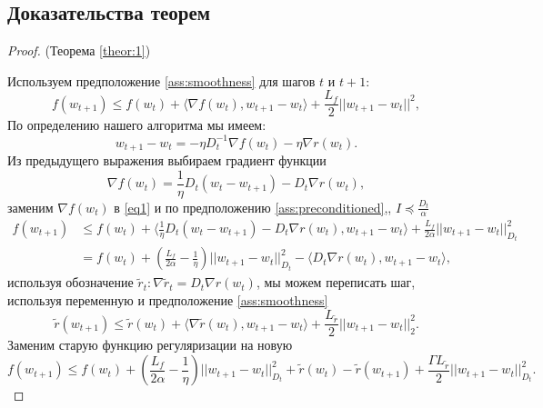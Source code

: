 \subsection{Доказательства теорем}
\label{appendix:theorems}

\begin{proof} (Теорема \ref{theor:1})
\label{proof:theorem1}

Используем предположение \eqref{ass:smoothness} для шагов $t$ и $t+1$:
\begin{equation} \label{eq1}
    f(w_{t+1}) \leq f(w_t) + \langle \nabla f(w_t), w_{t+1} - w_t \rangle + \frac{L_f}{2}||w_{t+1} - w_t ||^2,
\end{equation}
По определению нашего алгоритма мы имеем:
\begin{equation*}
w_{t+1} - w_t = -\eta D_t^{-1} \nabla f(w_t) - \eta \nabla r(w_t).
\end{equation*}
Из предыдущего выражения выбираем градиент функции
\begin{equation*}
\nabla f(w_t) = \frac{1}{\eta} D_t(w_t - w_{t+1}) - D_t \nabla r(w_t),
\end{equation*}
заменим $\nabla f(w_t)$ в \ref{eq1} и по предположению \ref{ass:preconditioned},, $I \preccurlyeq \frac{D_t}{\alpha}$
\begin{equation*}
\begin{split}
    f(w_{t+1}) &\leq f(w_t) + \langle \frac{1}{\eta}D_t(w_t - w_{t+1}) - D_t\nabla r(w_t), w_{t+1} - w_t \rangle + \frac{L_f}{2 \alpha} ||w_{t+1} - w_t||_{D_t}^2 \\
    &= f(w_t) + \left(\frac{L_f}{2 \alpha} - \frac{1}{\eta} \right) ||w_{t+1} - w_t||_{D_t}^2 - \langle D_t \nabla r(w_t), w_{t+1} - w_t \rangle,
\end{split}
\end{equation*}
используя обозначение $\widetilde{r}_t : \nabla \widetilde{r}_t = D_t \nabla r(w_t)$,
мы можем переписать шаг, используя переменную и предположение \eqref{ass:smoothness}
\begin{equation*}
    \widetilde{r}(w_{t+1}) \leq \widetilde{r}(w_t) + \langle \nabla \widetilde{r}(w_t), w_{t+1} - w_t \rangle + \frac{L_{\tilde{r}}}{2} ||w_{t+1} - w_t||_2^2.
\end{equation*}
Заменим старую функцию регуляризации на новую
\begin{equation*}
    f(w_{t+1}) \leq f(w_t) + \left( \frac{L_f}{2\alpha} - \frac{1}{\eta} \right) ||w_{t+1} - w_t||_{D_t}^2 + \tilde{r}(w_t) - \tilde{r}(w_{t+1}) + \frac{\Gamma L_{\tilde{r}}}{2}||w_{t+1}-w_t||_{D_t}^2.

\end{equation*}
\end{proof}
